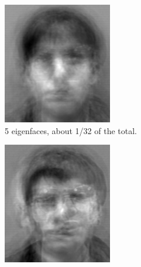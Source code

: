 \begin{figure}
\begin{subfigure}[b]{0.3\textwidth}
    \includegraphics[width=\textwidth]{figures/rebuiltThirtySecond.png}
    \caption{5 eigenfaces, about 1/32 of the total.}
    \label{fig:5_efaces}
\end{subfigure}
\begin{subfigure}[b]{0.3\textwidth}
    \includegraphics[width=\textwidth]{figures/rebuiltSixteenth.png}

\end{subfigure}
\end{figure}
